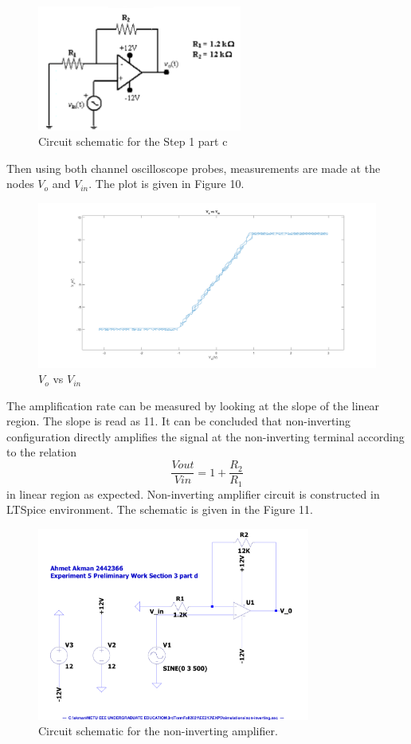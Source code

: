 \documentclass[letterpaper,12pt]{article}
\begin{document}
\begin{figure}[H]
	\centering
   \includegraphics[width=0.6\textwidth]{circuit4.png}
   \caption{Circuit schematic for the Step 1 part c}
\end{figure} 
Then using both channel oscilloscope probes, measurements are made at the nodes \(V_{o} \) and \( V_{in}\). The plot is given in Figure 10.

\begin{figure}[H]
	\centering
   \includegraphics[width=1\textwidth]{e_1_c.png}
   \caption{\(V_{o} \) vs \( V_{in}\)}
\end{figure} 
The amplification rate can be measured by looking at the slope of the linear region. The slope is read as 11. It can be concluded that non-inverting configuration directly amplifies the signal at the non-inverting terminal according to the relation \[\frac{V{out}}{V{in}} =1+ \frac{R_2}{R_1}\] in linear region as expected.
Non-inverting amplifier circuit is constructed in LTSpice environment. The schematic is given in the Figure 11.
\begin{figure}[H]
	\centering
   \includegraphics[width=0.8\textwidth]{non-inverting_SCH.pdf}
   \caption{Circuit schematic for the non-inverting amplifier.}
\end{figure} 
\end{document}
